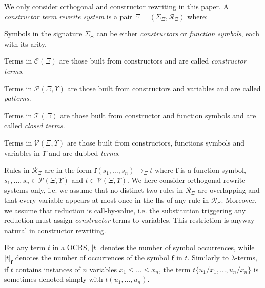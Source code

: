 \documentclass{LMCS}
\newcommand{\funone}{\mathbf{f}}
\newcommand{\patone}{s}
\newcommand{\varone}{x}
\newcommand{\termone}{t}
\newcommand{\termtwo}{u}
\newcommand{\Variables}{\Upsilon}
\newcommand{\Functions}[1]{\Sigma_{#1}}
\newcommand{\Rules}[1]{\mathcal{R}_{#1}}
\newcommand{\TRSone}{\Xi}
\newcommand{\TRStermsp}[1]{\mathcal{T}(#1)}
\newcommand{\TRSpatsp}[1]{\mathcal{P}(#1,\Variables)}
\newcommand{\TRSvartermsp}[1]{\mathcal{V}(#1,\Variables)}
\newcommand{\TRScontermsp}[1]{\mathcal{C}(#1)}
\newcommand{\rewr}[1]{\rightarrow_{#1}}
\newcommand{\length}[1]{|#1|}
\newcommand{\plength}[2]{|#1|_{#2}}
\newenvironment{varitemize}
{
\begin{list}{\labelitemi}
{\setlength{\itemsep}{0.0mm}
 \setlength{\topsep}{0.0mm}
 \setlength{\parindent}{0.0mm}
 \setlength{\parskip}{0.0mm}
 \setlength{\parsep}{0.0mm}
 \setlength{\partopsep}{0.0mm}
 \setlength{\leftmargin}{15pt}
 \setlength{\labelsep}{5pt}
 \setlength{\labelwidth}{10pt}}}
{
 \end{list} 
}
\newenvironment{varitemizeii}
{
\begin{list}{\labelitemiv}
{\setlength{\itemsep}{0.0mm}
 \setlength{\topsep}{0.0mm}
 \setlength{\parindent}{0.0mm}
 \setlength{\parskip}{0.0mm}
 \setlength{\parsep}{0.0mm}
 \setlength{\partopsep}{0.0mm}
 \setlength{\leftmargin}{15pt}
 \setlength{\labelsep}{5pt}
 \setlength{\labelwidth}{10pt}}}
{
 \end{list} 
}
\newcounter{number}
\begin{document}
We only consider orthogonal and constructor rewriting in this paper.
A \emph{constructor term rewrite system} is a pair 
$\TRSone=(\Functions{\TRSone},\Rules{\TRSone})$ where:
\begin{varitemize}
\item
  Symbols in the signature $\Functions{\TRSone}$ can be either
  \emph{constructors} or \emph{function symbols}, each with its arity.
  \begin{varitemizeii} 
    \item
      Terms in $\TRScontermsp{\TRSone}$ are those built
      from constructors and are called \emph{constructor terms}.
    \item
      Terms in $\TRSpatsp{\TRSone}$ are those built
      from constructors and variables and are called \emph{patterns}.
    \item
      Terms in $\TRStermsp{\TRSone}$ are those built
      from constructor and function symbols and are called \emph{closed terms}.
    \item
      Terms in $\TRSvartermsp{\TRSone}$ are those built
      from constructors, functions symbols and variables in $\Variables$ and are dubbed
      \emph{terms}.
    \end{varitemizeii}
\item
  Rules in $\Rules{\TRSone}$ are in the form $\funone(\patone_1,\ldots,\patone_n)\rewr{\TRSone}\termone$
  where $\funone$ is a function symbol, $\patone_1,\ldots,\patone_n\in\TRSpatsp{\TRSone}$
  and $t\in\TRSvartermsp{\TRSone}$.
  We here consider orthogonal rewrite systems only, i.e. we assume that no distinct two
  rules in $\Rules{\TRSone}$ are overlapping and that every variable appears at most
  once in the lhs of any rule in $\Rules{\TRSone}$. Moreover, we assume that reduction is
  call-by-value, i.e. the substitution triggering any reduction must assign
  \emph{constructor} terms to variables. This restriction is anyway natural in
  constructor rewriting.
\end{varitemize}
For any term $\termone$ in a OCRS, $\length{\termone}$ denotes 
the number of symbol occurrences, while $\plength{\termone}{\funone}$ denotes
the number of occurrences of the symbol $\funone$ in $\termone$.
Similarly to $\lambda$-terms, if $\termone$ contains instances of $n$ variables
$\varone_1\leq\ldots\leq\varone_n$, the term 
$\termone\{\termtwo_1/\varone_1,\ldots,\termtwo_n/\varone_n\}$
is sometimes denoted simply with $\termone(\termtwo_1,\ldots,\termtwo_n)$.
\end{document}
